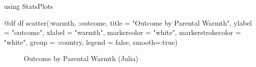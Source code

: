 \documentclass[
  letterpaper,
  DIV=11,
  numbers=noendperiod]{scrreprt}
\newenvironment{Shaded}{\begin{snugshade}}{\end{snugshade}}
\newcommand{\BuiltInTok}[1]{\textcolor[rgb]{0.00,0.23,0.31}{#1}}
\newcommand{\ConstantTok}[1]{\textcolor[rgb]{0.56,0.35,0.01}{#1}}
\newcommand{\FunctionTok}[1]{\textcolor[rgb]{0.28,0.35,0.67}{#1}}
\newcommand{\ImportTok}[1]{\textcolor[rgb]{0.00,0.46,0.62}{#1}}
\newcommand{\NormalTok}[1]{\textcolor[rgb]{0.00,0.23,0.31}{#1}}
\newcommand{\OperatorTok}[1]{\textcolor[rgb]{0.37,0.37,0.37}{#1}}
\newcommand{\PreprocessorTok}[1]{\textcolor[rgb]{0.68,0.00,0.00}{#1}}
\newcommand{\StringTok}[1]{\textcolor[rgb]{0.13,0.47,0.30}{#1}}
\begin{document}
\begin{Shaded}
\begin{Highlighting}[]
\ImportTok{using} \BuiltInTok{StatsPlots}

\PreprocessorTok{@df}\NormalTok{ df }\FunctionTok{scatter}\NormalTok{(}\OperatorTok{:}\NormalTok{warmth, }\OperatorTok{:}\NormalTok{outcome, }
\NormalTok{               title }\OperatorTok{=} \StringTok{"Outcome by Parental Warmth"}\NormalTok{,}
\NormalTok{               ylabel }\OperatorTok{=} \StringTok{"outcome"}\NormalTok{,}
\NormalTok{               xlabel }\OperatorTok{=} \StringTok{"warmth"}\NormalTok{,}
\NormalTok{               markercolor }\OperatorTok{=} \StringTok{"white"}\NormalTok{,}
\NormalTok{               markerstrokecolor }\OperatorTok{=} \StringTok{"white"}\NormalTok{,}
\NormalTok{               group }\OperatorTok{=} \OperatorTok{:}\NormalTok{country,}
\NormalTok{               legend }\OperatorTok{=} \ConstantTok{false}\NormalTok{,}
\NormalTok{               smooth}\OperatorTok{=:}\ConstantTok{true}\NormalTok{)}
\end{Highlighting}
\end{Shaded}

\begin{figure}[H]


\caption{\label{fig-Juliaspagplot}Outcome by Parental Warmth (Julia)}

\end{figure}%

\end{document}
